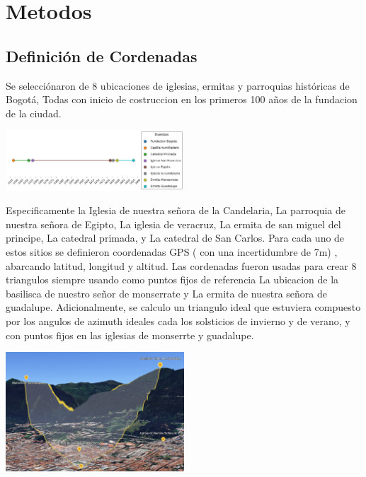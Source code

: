 \documentclass[a4paper,alpha-refs]{eSpectra}
\begin{document}
\vspace{-\baselineskip}  %
\justifying
\section{Metodos}

\subsection{Definición de Cordenadas}
\justifying
Se selecciónaron de 8 ubicaciones  de iglesias, ermitas y parroquias  históricas de Bogotá, Todas con inicio de costruccion en los primeros 100 años de la fundacion de la ciudad.

\centering
   \includegraphics[width=0.5\textwidth]{images/timeline_events.png}

\justifying
Especificamente  la Iglesia de nuestra señora de la Candelaria, La parroquia de nuestra señora de Egipto, La iglesia de veracruz, La ermita de san miguel del principe, La catedral primada, y La catedral de San Carlos. 
Para cada uno de estos sitios se definieron coordenadas  GPS ( con una incertidumbre de 7m) , abarcando latitud, longitud y altitud. Las cordenadas fueron usadas para crear 8 triangulos siempre usando como puntos fijos de referencia La ubicacion de la basilisca de nuestro señor de monserrate y La ermita de nuestra señora de guadalupe. Adicionalmente, se calculo un triangulo ideal que estuviera compuesto por los angulos de azimuth ideales cada los solsticios de invierno y de verano, y con puntos fijos en las iglesias de monserrte y guadalupe.

\centering
   \includegraphics[width=0.5\textwidth]{images/Pasted image 20250617164513.png}
\justifying
\end{document}
